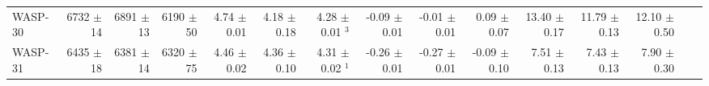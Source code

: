 \begin{sidewaystable*}[t!]
{\begin{tabular}{l r r r r r r r r r r r r r r}
WASP-30  
&  6732  $\pm$ 14 
& 6891  $\pm$ 13 
&  6190 $\pm$ 50 
&   4.74 $\pm$ 0.01
&  4.18  $\pm$ 0.18 
&  4.28  $\pm$ 0.01 $^3$ 
&  -0.09  $\pm$ 0.01 
& -0.01  $\pm$ 0.01 
&  0.09  $\pm$ 0.07 
&  13.40  $\pm$ 0.17 
& 11.79  $\pm$ 0.13 
&  12.10  $\pm$ 0.50   \\




    
    
WASP-31  
& 6435  $\pm$ 18
& 6381  $\pm$ 14 
&  6320 $\pm$ 75 
& 4.46  $\pm$ 0.02 
 &  4.36  $\pm$ 0.10 
 &  4.31  $\pm$ 0.02 $^1$
 &  -0.26  $\pm$ 0.01 
 & -0.27  $\pm$ 0.01
  &  -0.09   $\pm$ 0.10 
  & 7.51  $\pm$ 0.13
   &7.43  $\pm$ 0.13
    &  7.90   $\pm$ 0.30   \\



\end{tabular}}
\end{sidewaystable*}

